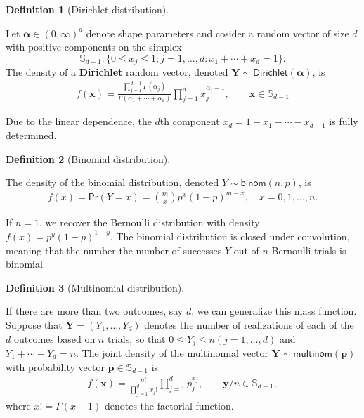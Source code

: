 \documentclass[
  11pt,
  letterpaper,
]{scrbook}
\theoremstyle{definition}
\theoremstyle{definition}
\theoremstyle{definition}
\newtheorem{definition}{Definition}[chapter]
\theoremstyle{plain}
\theoremstyle{plain}
\theoremstyle{remark}
\begin{document}
\begin{definition}[Dirichlet
distribution]\protect\hypertarget{def-dirichlet-dist}{}\label{def-dirichlet-dist}

Let \(\boldsymbol{\alpha} \in (0, \infty)^d\) denote shape parameters
and cosider a random vector of size \(d\) with positive components on
the simplex
\[\mathbb{S}_{d-1}: \{ 0 \leq x_j \leq 1; j=1, \ldots, d: x_1 + \cdots + x_d=1\}.\]
The density of a \textbf{Dirichlet} random vector, denoted
\(\boldsymbol{Y} \sim \mathsf{Dirichlet}(\boldsymbol{\alpha})\), is
\begin{align*}
f(\boldsymbol{x}) = \frac{\prod_{j=1}^{d-1}\Gamma(\alpha_j)}{\Gamma(\alpha_1 + \cdots + \alpha_d)}\prod_{j=1}^{d} x_j^{\alpha_j-1}, \qquad \boldsymbol{x} \in \mathbb{S}_{d-1}
\end{align*}

Due to the linear dependence, the \(d\)th component
\(x_d = 1- x_1 - \cdots - x_{d-1}\) is fully determined.

\end{definition}

\begin{definition}[Binomial
distribution]\protect\hypertarget{def-binomial}{}\label{def-binomial}

The density of the binomial distribution, denoted
\(Y \sim \mathsf{binom}(n, p)\), is \begin{align*}
f(x) = \mathsf{Pr}(Y=x) = \binom{m}{x}p^x (1-p)^{m-x}, \quad x=0, 1, \ldots, n.
\end{align*}

If \(n=1\), we recover the Bernoulli distribution with density
\(f(x) = p^{y}(1-p)^{1-y}\). The binomial distribution is closed under
convolution, meaning that the number the number of successes \(Y\) out
of \(n\) Bernoulli trials is binomial

\end{definition}

\begin{definition}[Multinomial
distribution]\protect\hypertarget{def-multinom-dist}{}\label{def-multinom-dist}

If there are more than two outcomes, say \(d\), we can generalize this
mass function. Suppose that \(\boldsymbol{Y}=(Y_1, \ldots, Y_d)\)
denotes the number of realizations of each of the \(d\) outcomes based
on \(n\) trials, so that \(0 \leq Y_j \leq n (j=1, \ldots, d)\) and
\(Y_1 + \cdots + Y_d=n\). The joint density of the multinomial vector
\(\boldsymbol{Y} \sim \mathsf{multinom}(\boldsymbol{p})\) with
probability vector \(\boldsymbol{p} \in \mathbb{S}_{d-1}\) is
\begin{align*}
f(\boldsymbol{x}) = \frac{n!}{\prod_{j=1}^d x_j!} \prod_{j=1}^d p_j^{x_j}, \qquad \boldsymbol{y}/n \in \mathbb{S}_{d-1},
\end{align*} where \(x! = \Gamma(x+1)\) denotes the factorial function.

\end{definition}
\end{document}

